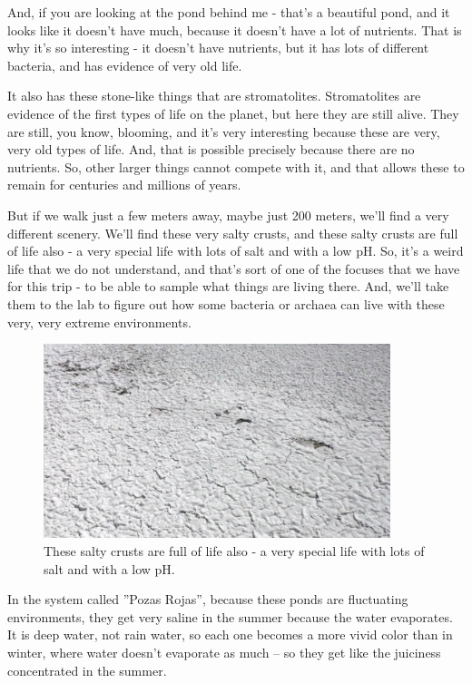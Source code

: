 \documentclass[]{article}
\begin{document}
And, if you are looking at the pond behind me - that's a beautiful pond, and it looks like it doesn't have much, because it doesn't have a lot of nutrients. That is why it's so interesting - it doesn't have nutrients, but it has lots of different bacteria, and has evidence of very old life.

It also has these stone-like things that are stromatolites. Stromatolites are evidence of the first types of life on the planet, but here they are still alive. They are still, you know, blooming, and it's very interesting because these are very, very old types of life. And, that is possible precisely because there are no nutrients. So, other larger things
cannot compete with it, and that allows these to remain for centuries and millions of years.


But if we walk just a few meters away, maybe just 200 meters, we'll find a very different scenery. We'll find these very salty crusts, and these salty crusts are full of life also - a very special life with lots of salt and with a low pH. So, it's a weird life that we do not understand, and that's sort of one of the focuses that we have for this trip - to be able to sample what things are living there. And, we'll take them to the lab to figure out how some bacteria or archaea can live with these very, very extreme environments.

\begin{figure}[h!]
	\caption{These salty crusts are full of life also - a very special life with lots of salt and with a low pH.} 
	\includegraphics[width=0.9\textwidth]{CuatroCienegas5}
\end{figure}

In the system called ''Pozas Rojas'', because these ponds are fluctuating environments, they get very saline in the summer because the water evaporates. It is deep water, not rain water, so each one becomes a more vivid color than in winter, where water doesn't evaporate as much -- so they get like the juiciness concentrated in the summer.
\end{document}

